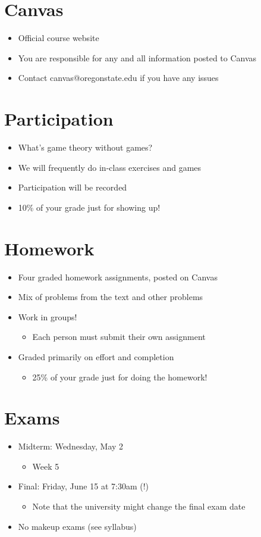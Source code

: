 \documentclass[11pt]{article}
\begin{document}
\section*{Canvas}
\label{sec:org8278c7d}
\begin{itemize}
\item Official course website
\item You are responsible for any and all information posted to Canvas
\item Contact canvas@oregonstate.edu if you have any issues
\end{itemize}

\section*{Participation}
\label{sec:org71e1bb5}
\begin{itemize}
\item What's game theory without games?
\item We will frequently do in-class exercises and games
\item Participation will be recorded
\item 10\% of your grade just for showing up!
\end{itemize}

\section*{Homework}
\label{sec:org7627029}
\begin{itemize}
\item Four graded homework assignments, posted on Canvas
\item Mix of problems from the text and other problems
\item Work in groups!
\begin{itemize}
\item Each person must submit their own assignment
\end{itemize}
\item Graded primarily on effort and completion
\begin{itemize}
\item 25\% of your grade just for doing the homework!
\end{itemize}
\end{itemize}

\section*{Exams}
\label{sec:org9bec7d3}
\begin{itemize}
\item Midterm: Wednesday, May 2 
\begin{itemize}
\item Week 5
\end{itemize}
\item Final: Friday, June 15 at 7:30am (!)
\begin{itemize}
\item Note that the university might change the final exam date
\end{itemize}
\item No makeup exams (see syllabus)
\end{itemize}
\end{document}
